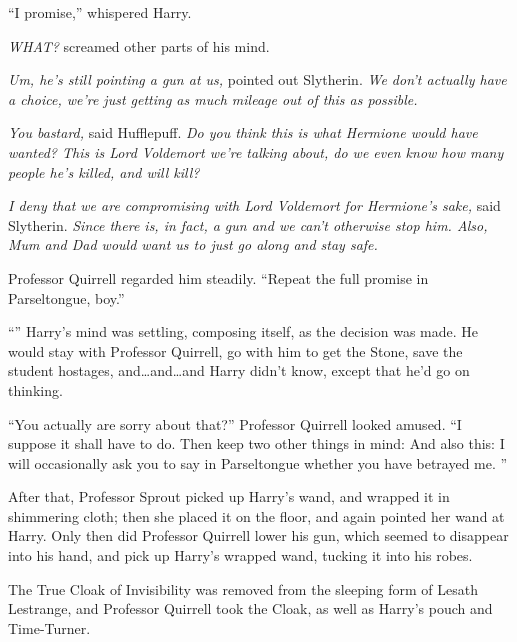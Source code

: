 “I promise,” whispered Harry.

\emph{WHAT?} screamed other parts of his mind.

\emph{Um, he’s still pointing a gun at us,} pointed out Slytherin. \emph{We don’t actually have a choice, we’re just getting as much mileage out of this as possible.}

\emph{You bastard,} said Hufflepuff. \emph{Do you think this is what Hermione would have wanted? This is Lord Voldemort we’re talking about, do we even know how many people he’s killed, and will kill?}

\emph{I deny that we are compromising with Lord Voldemort for Hermione’s sake,} said Slytherin. \emph{Since there is, in fact, a gun and we can’t otherwise stop him. Also, Mum and Dad would want us to just go along and stay safe.}

Professor Quirrell regarded him steadily. “Repeat the full promise in Parseltongue, boy.”

“” Harry’s mind was settling, composing itself, as the decision was made. He would stay with Professor Quirrell, go with him to get the Stone, save the student hostages, and…and…and Harry didn’t know, except that he’d go on thinking.

“You actually are sorry about that?” Professor Quirrell looked amused. “I suppose it shall have to do. Then keep two other things in mind:  And also this: I will occasionally ask you to say in Parseltongue whether you have betrayed me. ”

\later

After that, Professor Sprout picked up Harry’s wand, and wrapped it in shimmering cloth; then she placed it on the floor, and again pointed her wand at Harry. Only then did Professor Quirrell lower his gun, which seemed to disappear into his hand, and pick up Harry’s wrapped wand, tucking it into his robes.

The True Cloak of Invisibility was removed from the sleeping form of Lesath Lestrange, and Professor Quirrell took the Cloak, as well as Harry’s pouch and Time-Turner.

